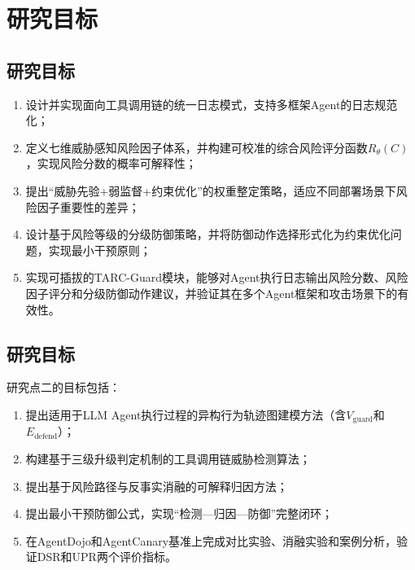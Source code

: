 \section{研究目标}


\subsection{研究目标}

\begin{enumerate}
  \item 设计并实现面向工具调用链的统一日志模式，支持多框架Agent的日志规范化；
  \item 定义七维威胁感知风险因子体系，并构建可校准的综合风险评分函数$R_\theta(C)$，实现风险分数的概率可解释性；
  \item 提出“威胁先验+弱监督+约束优化”的权重整定策略，适应不同部署场景下风险因子重要性的差异；
  \item 设计基于风险等级的分级防御策略，并将防御动作选择形式化为约束优化问题，实现最小干预原则；
  \item 实现可插拔的TARC-Guard模块，能够对Agent执行日志输出风险分数、风险因子评分和分级防御动作建议，并验证其在多个Agent框架和攻击场景下的有效性。
\end{enumerate}

\subsection{研究目标}

研究点二的目标包括：
\begin{enumerate}
  \item 提出适用于LLM Agent执行过程的异构行为轨迹图建模方法（含$V_{\text{guard}}$和$E_{\text{defend}}$）；
  \item 构建基于三级升级判定机制的工具调用链威胁检测算法；
  \item 提出基于风险路径与反事实消融的可解释归因方法；
  \item 提出最小干预防御公式，实现“检测—归因—防御”完整闭环；
  \item 在AgentDojo和AgentCanary基准上完成对比实验、消融实验和案例分析，验证DSR和UPR两个评价指标。
\end{enumerate}
